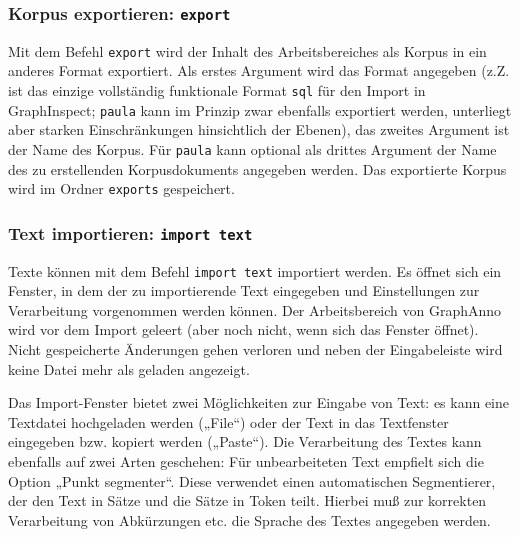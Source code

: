 \documentclass[12pt]{scrartcl}
\begin{document}
\subsubsection{Korpus exportieren: \texttt{export}}\label{befehl-export}

Mit dem Befehl \texttt{export} wird der Inhalt des Arbeitsbereiches als Korpus in ein anderes Format exportiert. Als erstes Argument wird das Format angegeben (z.Z. ist das einzige vollständig funktionale Format \texttt{sql} für den Import in GraphInspect; \texttt{paula} kann im Prinzip zwar ebenfalls exportiert werden, unterliegt aber starken Einschränkungen hinsichtlich der Ebenen), das zweites Argument ist der Name des Korpus. Für \texttt{paula} kann optional als drittes Argument der Name des zu erstellenden Korpusdokuments angegeben werden. Das exportierte Korpus wird im Ordner \texttt{exports} gespeichert.


\subsubsection{Text importieren: \texttt{import text}}

Texte können mit dem Befehl \texttt{import text} importiert werden. Es öffnet sich ein Fenster, in dem der zu importierende Text eingegeben und Einstellungen zur Verarbeitung vorgenommen werden können.
Der Arbeitsbereich von GraphAnno wird vor dem Import geleert (aber noch nicht, wenn sich das Fenster öffnet). Nicht gespeicherte Änderungen gehen verloren und neben der Eingabeleiste wird keine Datei mehr als geladen angezeigt.

Das Import-Fenster bietet zwei Möglichkeiten zur Eingabe von Text: es kann eine Textdatei hochgeladen werden („File“) oder der Text in das Textfenster eingegeben bzw. kopiert werden („Paste“). Die Verarbeitung des Textes kann ebenfalls auf zwei Arten geschehen: Für unbearbeiteten Text empfielt sich die Option „Punkt segmenter“. Diese verwendet einen automatischen Segmentierer, der den Text in Sätze und die Sätze in Token teilt. Hierbei muß zur korrekten Verarbeitung von Abkürzungen etc. die Sprache des Textes angegeben werden.
\end{document}
